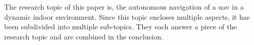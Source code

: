 The research topic of this paper is, the autonomous navigation of a \acs{uav} in a dynamic indoor environment. Since this topic encloses multiple aspects, it has been subdivided into multiple sub\hyp{}topics. They each answer a piece of the research topic and are combined in the conclusion.